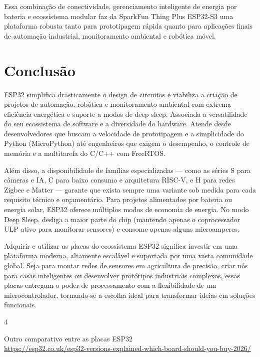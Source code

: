 \documentclass[a4paper,11pt]{article}
\begin{document}
Essa combinação de conectividade, gerenciamento inteligente de energia por bateria e ecossistema modular faz da SparkFun Thing Plus ESP32-S3 uma plataforma robusta tanto para prototipagem rápida quanto para aplicações finais de automação industrial, monitoramento ambiental e robótica móvel.

\section{Conclusão}
ESP32 simplifica drasticamente o design de circuitos e viabiliza a criação de projetos de automação, robótica e monitoramento ambiental com extrema eficiência energética e suporte a modos de deep sleep. Associada a versatilidade do seu ecossistema de software e a diversidade do hardware. Atende desde desenvolvedores que buscam a velocidade de prototipagem e a simplicidade do Python (MicroPython) até engenheiros que exigem o desempenho, o controle de memória e a multitarefa do C/C++ com FreeRTOS. 

Além disso, a disponibilidade de famílias especializadas — como as séries S para câmeras e IA, C para baixo consumo e arquitetura RISC-V, e H para redes Zigbee e Matter — garante que exista sempre uma variante sob medida para cada requisito técnico e orçamentário. Para projetos alimentados por bateria ou energia solar, ESP32 oferece múltiplos modos de economia de energia. No modo Deep Sleep, desliga a maior parte do chip (mantendo apenas o coprocessador ULP ativo para monitorar sensores) e consome apenas alguns microamperes.

Adquirir e utilizar as placas do ecossistema ESP32 significa investir em uma plataforma moderna, altamente escalável e suportada por uma vasta comunidade global. Seja para montar redes de sensores em agricultura de precisão, criar nós para casas inteligentes ou desenvolver protótipos industriais complexos, essas placas entregam o poder de processamento com a flexibilidade de um microcontrolador, tornando-se a escolha ideal para transformar ideias em soluções funcionais.



\begin{thebibliography}{4}
  
  
  Outro comparativo entre as placas ESP32 \\
  \url{https://esp32.co.uk/esp32-versions-explained-which-board-should-you-buy-2026/}
\end{thebibliography}
  
\end{document}
